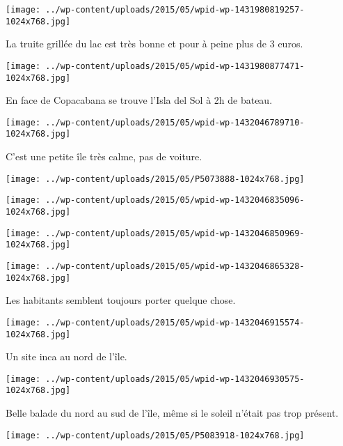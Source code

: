 \centerline{\texttt{[image: ../wp-content/uploads/2015/05/wpid-wp-1431980819257-1024x768.jpg]} } 
 \newline
 La truite grillée du lac est très bonne et pour à peine plus de 3 euros. \newline
 \newline
\centerline{\texttt{[image: ../wp-content/uploads/2015/05/wpid-wp-1431980877471-1024x768.jpg]} } 
 \newline
 En face de Copacabana se trouve l'Isla del Sol à 2h de bateau. \newline
 \newline
\centerline{\texttt{[image: ../wp-content/uploads/2015/05/wpid-wp-1432046789710-1024x768.jpg]} } 
 \newline
 C'est une petite île très calme, pas de voiture. \newline
 \newline
\centerline{\texttt{[image: ../wp-content/uploads/2015/05/P5073888-1024x768.jpg]} } 
 \newline
 \newline
\centerline{\texttt{[image: ../wp-content/uploads/2015/05/wpid-wp-1432046835096-1024x768.jpg]} } 
 \newline
 \newline
\centerline{\texttt{[image: ../wp-content/uploads/2015/05/wpid-wp-1432046850969-1024x768.jpg]} } 
 \newline
 \newline
\centerline{\texttt{[image: ../wp-content/uploads/2015/05/wpid-wp-1432046865328-1024x768.jpg]} } 
 \newline
 Les habitants semblent toujours porter quelque chose. \newline
 \newline
\centerline{\texttt{[image: ../wp-content/uploads/2015/05/wpid-wp-1432046915574-1024x768.jpg]} } 
 \newline
 Un site inca au nord de l'île. \newline
 \newline
\centerline{\texttt{[image: ../wp-content/uploads/2015/05/wpid-wp-1432046930575-1024x768.jpg]} } 
 \newline
 Belle balade du nord au sud de l'île, même si le soleil n'était pas trop présent. \newline
 \newline
\centerline{\texttt{[image: ../wp-content/uploads/2015/05/P5083918-1024x768.jpg]} } 
